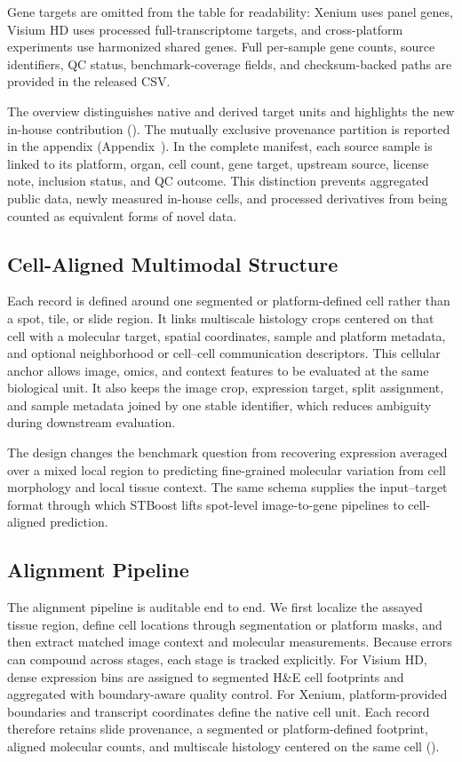 \documentclass[sigconf,review]{acmart}
\begin{document}
Gene targets are omitted from the table for readability: Xenium uses panel
genes, Visium HD uses processed full-transcriptome targets, and cross-platform
experiments use harmonized shared genes. Full per-sample gene counts, source
identifiers, QC status, benchmark-coverage fields, and checksum-backed paths
are provided in the released CSV.

The overview distinguishes native and derived target units and highlights the
new in-house contribution (). The mutually
exclusive provenance partition is reported in the appendix
(Appendix~). In the complete manifest, each
source sample is linked to its platform, organ, cell count, gene target,
upstream source, license note, inclusion status, and QC outcome.
This distinction prevents aggregated public data, newly measured in-house
cells, and processed derivatives from being counted as equivalent forms of
novel data.



\subsection{Cell-Aligned Multimodal Structure}

Each record is defined around one segmented or platform-defined cell rather
than a spot, tile, or slide region. It links multiscale histology crops centered
on that cell with a molecular target, spatial coordinates, sample and platform
metadata, and optional neighborhood or cell--cell communication descriptors.
This cellular anchor allows image, omics, and context features to be evaluated
at the same biological unit. It also keeps the image crop, expression target,
split assignment, and sample metadata joined by one stable identifier, which
reduces ambiguity during downstream evaluation.

The design changes the benchmark question from recovering expression averaged
over a mixed local region to predicting fine-grained molecular variation from
cell morphology and local tissue context. The same schema supplies the
input--target format through which STBoost lifts spot-level image-to-gene
pipelines to cell-aligned prediction.

\subsection{Alignment Pipeline}
The alignment pipeline is auditable end to end. We first localize the assayed
tissue region, define cell locations through segmentation or platform masks,
and then extract matched image context and molecular measurements. Because
errors can compound across stages, each stage is tracked explicitly. For
Visium HD, dense expression bins are assigned to segmented H\&E cell footprints
and aggregated with boundary-aware quality control. For Xenium,
platform-provided boundaries and transcript coordinates define the native
cell unit. Each record therefore retains slide provenance, a segmented or
platform-defined footprint, aligned molecular counts, and multiscale histology
centered on the same cell ().
\end{document}
